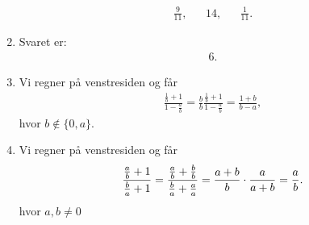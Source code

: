 \begin{enumerate}
\begin{align*}
\frac{9}{11},&& 14,&&\frac{1}{11}.
\end{align*}
\item Svaret er:
\begin{align*}
6.
\end{align*}
\item Vi regner på venstresiden og får
\begin{align*}
\frac{ \frac{1}{b}+1 }{1- \frac{a}{b}}=\frac{b}{b}\frac{ \frac{1}{b}+1 }{1- \frac{a}{b}}=\frac{1+b}{b-a},
\end{align*}
hvor $b\notin \{0,a\}$.
\item Vi regner på venstresiden og får
\begin{align*}
\frac{ \frac{a}{b}+1}{ \frac{b}{a}+1}=\frac{ \frac{a}{b}+\frac{b}{b} }{ \frac{b}{a}+\frac{a}{a} }=\frac{a+b}{b}\cdot \frac{a}{a+b}=\frac{a}{b}.
\end{align*}
hvor $a,b\neq 0$
\end{enumerate}
